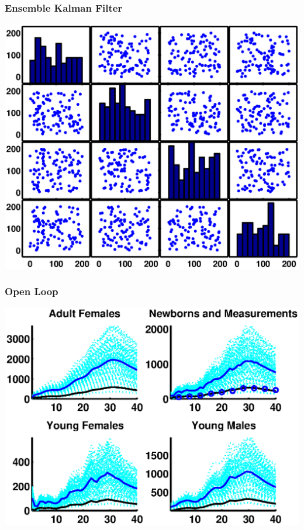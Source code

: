 \documentclass[mathserif]{beamer}
\begin{document}
\begin{frame}
\begin{center}
\frametitle{Ensemble Kalman Filter}
\includegraphics[width=1\textwidth]{initcov}
\end{center}
\end{frame}

\begin{frame}
\frametitle{Open Loop}
\begin{center}
\includegraphics[width=1\textwidth]{openloop}
\end{center}
\end{frame}
\end{document}
